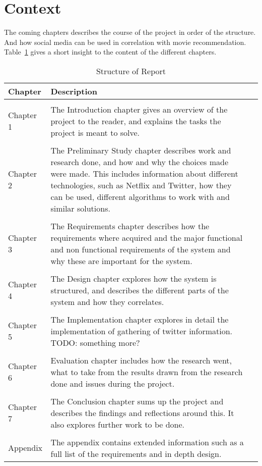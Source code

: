 \section{Context}
The coming chapters describes the course of the project in order of the structure. And how social media can be used in correlation with movie recommendation. Table~\ref{table-reportstructure} gives a short insight to the content of the different chapters.

\begin{table}
\centering
\begin{tabularx}{\textwidth}{ l X l }
  \textbf{Chapter}      & \textbf{Description} \\
  \hline \\ [-1.5ex]
  Chapter 1 & The Introduction chapter gives an overview of the project to the reader, and explains the tasks the project is meant to solve. \\
  \hline \\ [-1.5ex]
  Chapter 2 & The Preliminary Study chapter describes work and research done, and how and why the choices made were made. This includes information about different technologies, such as Netflix and Twitter, how they can be used, different algorithms to work with and similar solutions. \\
  \hline \\ [-1.5ex]
  Chapter 3 & The Requirements chapter describes how the requirements where acquired and the major functional and non functional requirements of the system and why these are important for the system. \\
  \hline \\ [-1.5ex]
  Chapter 4 & The Design chapter explores how the system is structured, and describes the different parts of the system and how they correlates. \\
  \hline \\ [-1.5ex]
  Chapter 5 & The Implementation chapter explores in detail the implementation of gathering of twitter information. TODO: something more?  \\
  \hline \\ [-1.5ex]
  Chapter 6 & Evaluation chapter includes how the research went, what to take from the results drawn from the research done and issues during the project. \\
  \hline \\ [-1.5ex]
  Chapter 7 & The Conclusion chapter sums up the project and describes the findings and reflections around this. It also explores further work to be done. \\
  \hline \\ [-1.5ex]
  Appendix & The appendix contains extended information such as a full list of the requirements and in depth design. \\
\end{tabularx}
\caption{Structure of Report}
\label{table-reportstructure}
\end{table}
